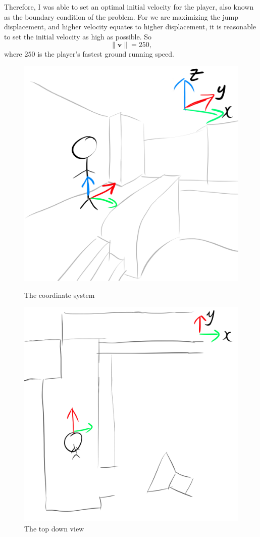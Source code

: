 \documentclass[a4paper,12pt]{article}
\newcommand{\tvec}[1]{\boldsymbol{#1}}
\newcommand{\tmag}[1]{\|#1\|}
\newcommand{\tv}{\tvec{v}}
\begin{document}
Therefore, I was able to set an optimal initial velocity for the player, also known as the boundary condition of the problem. For we are maximizing the jump displacement, and higher velocity equates to higher displacement, it is reasonable to set the initial velocity as high as possible. So
\[
    \tmag{\tv} = 250,
\]
where $250$ is the player's fastest ground running speed.


\begin{figure}[H]
    \centering
    \begin{minipage}{.5\textwidth}
        \centering
        \includegraphics[width=0.9\linewidth]{assets/1coordinates.png}
        \caption{The coordinate system}
        \label{fig:1coordinates}
    \end{minipage}%
    \begin{minipage}{.5\textwidth}
        \centering
        \includegraphics[width=0.9\linewidth]{assets/2coordinate_topdown.png}
        \caption{The top down view}
        \label{fig:2coordinates_topdown}
    \end{minipage}
\end{figure}
\end{document}
